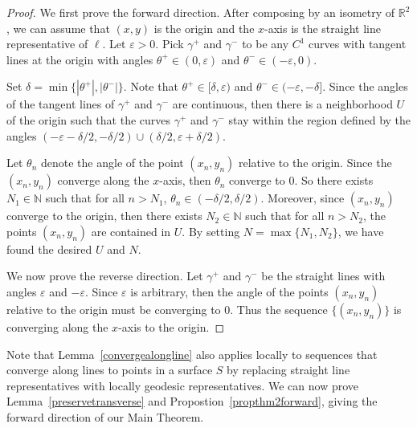 \documentclass[sn-mathphys-num]{sn-jnl}%
\theoremstyle{thmstyleone}%
\theoremstyle{thmstyletwo}%
\theoremstyle{thmstylethree}%
\begin{document}
\begin{proof}
We first prove the forward direction.  After composing by an isometry of $\mathbb{R}^2$, we can assume that $(x,y)$ is the origin and the $x$-axis is the straight line representative of $\ell$. Let $\varepsilon >0$.  Pick $\gamma^+$ and $\gamma^-$ to be any $C^1$ curves with tangent lines at the origin with angles $\theta^+ \in (0,  \varepsilon)$ and  $\theta^- \in (- \varepsilon, 0)$.  


Set $\delta = \min\{|\theta^+|, |\theta^-|\}$.  Note that $\theta^+ \in [\delta, \varepsilon)$ and $\theta^- \in (-\varepsilon, -\delta]$. Since the angles of the tangent lines of $\gamma^+$ and $\gamma^-$ are continuous,  then there is a neighborhood $U$ of the origin such that the curves $\gamma^+$ and $\gamma^-$ stay within the region defined by the angles $(- \varepsilon -\delta/2, -\delta/2) \cup (\delta/2, \varepsilon + \delta/2)$.  

Let $\theta_n$ denote the angle of the point $(x_n, y_n)$ relative to the origin.  Since the $(x_n, y_n)$ converge along the $x$-axis, then $\theta_n$ converge to 0.  So there exists  $N_1 \in \mathbb{N}$ such that for all $n >N_1$, $\theta_n \in (-\delta/2, \delta/2)$.  Moreover, since $(x_n, y_n)$ converge to the origin, then there exists $N_2 \in \mathbb{N}$ such that for all $n >N_2$, the points $(x_n, y_n)$ are contained in $U$.  By setting $N = \max\{N_1, N_2\}$, we have found the desired $U$ and $N$.

We now prove the reverse direction.  Let $\gamma^+$ and $\gamma^-$ be the straight lines with angles $\varepsilon$ and $-\varepsilon$. Since $\varepsilon$ is arbitrary, then the angle of the points $(x_n, y_n)$ relative to the origin must be converging to 0.  Thus the sequence $\{(x_n, y_n)\}$ is converging along the $x$-axis to the origin.  
\end{proof}

Note that Lemma~\ref{convergealongline} also applies locally to sequences that converge along lines to points in a surface $S$ by replacing straight line representatives with locally geodesic representatives.  We can now prove Lemma~\ref{preservetransverse} and Propostion~\ref{propthm2forward}, giving the forward direction of our Main Theorem. 
\end{document}

